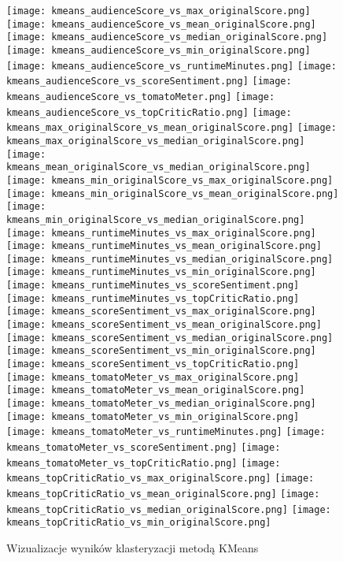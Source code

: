 \documentclass[a4paper,12pt,titlepage]{article}
\begin{document}
\begin{figure}[H]
\centering
\texttt{[image: kmeans\_audienceScore\_vs\_max\_originalScore.png]}
\texttt{[image: kmeans\_audienceScore\_vs\_mean\_originalScore.png]}
\texttt{[image: kmeans\_audienceScore\_vs\_median\_originalScore.png]}
\texttt{[image: kmeans\_audienceScore\_vs\_min\_originalScore.png]}
\texttt{[image: kmeans\_audienceScore\_vs\_runtimeMinutes.png]}
\texttt{[image: kmeans\_audienceScore\_vs\_scoreSentiment.png]}
\texttt{[image: kmeans\_audienceScore\_vs\_tomatoMeter.png]}
\texttt{[image: kmeans\_audienceScore\_vs\_topCriticRatio.png]}
\texttt{[image: kmeans\_max\_originalScore\_vs\_mean\_originalScore.png]}
\texttt{[image: kmeans\_max\_originalScore\_vs\_median\_originalScore.png]}
\texttt{[image: kmeans\_mean\_originalScore\_vs\_median\_originalScore.png]}
\texttt{[image: kmeans\_min\_originalScore\_vs\_max\_originalScore.png]}
\texttt{[image: kmeans\_min\_originalScore\_vs\_mean\_originalScore.png]}
\texttt{[image: kmeans\_min\_originalScore\_vs\_median\_originalScore.png]}
\texttt{[image: kmeans\_runtimeMinutes\_vs\_max\_originalScore.png]}
\texttt{[image: kmeans\_runtimeMinutes\_vs\_mean\_originalScore.png]}
\texttt{[image: kmeans\_runtimeMinutes\_vs\_median\_originalScore.png]}
\texttt{[image: kmeans\_runtimeMinutes\_vs\_min\_originalScore.png]}
\texttt{[image: kmeans\_runtimeMinutes\_vs\_scoreSentiment.png]}
\texttt{[image: kmeans\_runtimeMinutes\_vs\_topCriticRatio.png]}
\texttt{[image: kmeans\_scoreSentiment\_vs\_max\_originalScore.png]}
\texttt{[image: kmeans\_scoreSentiment\_vs\_mean\_originalScore.png]}
\texttt{[image: kmeans\_scoreSentiment\_vs\_median\_originalScore.png]}
\texttt{[image: kmeans\_scoreSentiment\_vs\_min\_originalScore.png]}
\texttt{[image: kmeans\_scoreSentiment\_vs\_topCriticRatio.png]}
\texttt{[image: kmeans\_tomatoMeter\_vs\_max\_originalScore.png]}
\texttt{[image: kmeans\_tomatoMeter\_vs\_mean\_originalScore.png]}
\texttt{[image: kmeans\_tomatoMeter\_vs\_median\_originalScore.png]}
\texttt{[image: kmeans\_tomatoMeter\_vs\_min\_originalScore.png]}
\texttt{[image: kmeans\_tomatoMeter\_vs\_runtimeMinutes.png]}
\texttt{[image: kmeans\_tomatoMeter\_vs\_scoreSentiment.png]}
\texttt{[image: kmeans\_tomatoMeter\_vs\_topCriticRatio.png]}
\texttt{[image: kmeans\_topCriticRatio\_vs\_max\_originalScore.png]}
\texttt{[image: kmeans\_topCriticRatio\_vs\_mean\_originalScore.png]}
\texttt{[image: kmeans\_topCriticRatio\_vs\_median\_originalScore.png]}
\texttt{[image: kmeans\_topCriticRatio\_vs\_min\_originalScore.png]}
\caption{Wizualizacje wyników klasteryzacji metodą KMeans}
\end{figure}
\end{document}
